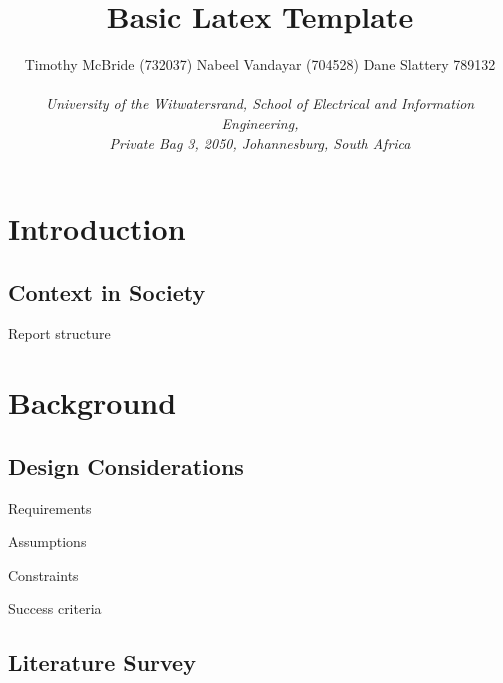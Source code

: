 \documentclass{TechReport}
\begin{document}
%
\title{Basic Latex Template}
%
\author{Timothy McBride (732037) \hspace{1.5em} Nabeel Vandayar (704528) \hspace{1.5em} Dane Slattery 789132\\  
\\	
\emph{University of the Witwatersrand, School of Electrical and Information Engineering,\\ Private Bag 3, 2050,
	Johannesburg, South Africa
                                                              }}


%
\maketitle
%
\section{Introduction}
\label{sec:Introduction}


\subsection{Context in Society}
\label{sec:Context}

Report structure

\section{Background}
\label{sec:Background}

\subsection{Design Considerations}
\label{sec:Considerations}
Requirements

Assumptions

Constraints

Success criteria

\subsection{Literature Survey}
\label{sec:LitSurvey}
\end{document}
